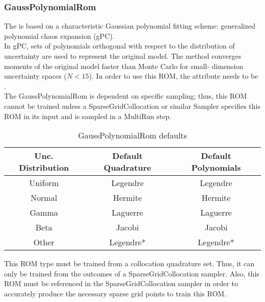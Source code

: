 \subsubsection{GaussPolynomialRom}
  The  is based on a                         characteristic Gaussian
  polynomial fitting scheme: generalized polynomial chaos                         expansion (gPC).
  \\                         In gPC, sets of polynomials orthogonal with respect to the distribution
  of uncertainty                         are used to represent the original model.  The method
  converges moments of the original                         model faster than Monte Carlo for small-
  dimension uncertainty spaces ($N<15$).                         In order to use this ROM, the
   attribute  needs to                         be
  .                         \\                         The
  GaussPolynomialRom is dependent on specific sampling; thus, this ROM cannot be trained unless a
  SparseGridCollocation or similar Sampler specifies this ROM in its input and is sampled in a
  MultiRun step.                         \begin{table}[htb]                           \centering
  \begin{tabular}{c | c c}                             Unc. Distribution & Default Quadrature &
  Default Polynomials \\ \hline                             Uniform & Legendre & Legendre \\
  Normal & Hermite & Hermite \\ \hline                             Gamma & Laguerre & Laguerre \\
  Beta & Jacobi & Jacobi \\ \hline                             Other & Legendre* & Legendre*
  \end{tabular}                           \caption{GaussPolynomialRom defaults}
  \label{tab:gpcCompatible}                         \end{table}                         \nb This ROM
  type must be trained from a collocation quadrature set.                         Thus, it can only
  be trained from the outcomes of a SparseGridCollocation sampler.                         Also,
  this ROM must be referenced in the SparseGridCollocation sampler in order to
  accurately produce the necessary sparse grid points to train this ROM.
                           \\
